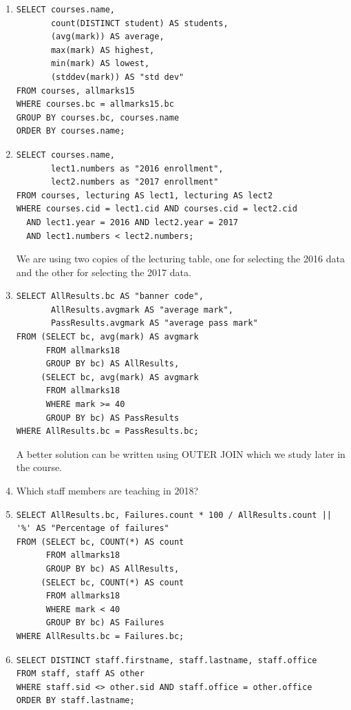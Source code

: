\begin{enumerate}
    \item[a.] 
\begin{lstlisting}
SELECT courses.name,
       count(DISTINCT student) AS students,
       (avg(mark)) AS average,
       max(mark) AS highest,
       min(mark) AS lowest,
       (stddev(mark)) AS "std dev"
FROM courses, allmarks15
WHERE courses.bc = allmarks15.bc
GROUP BY courses.bc, courses.name
ORDER BY courses.name;
\end{lstlisting}

    \item[b.]
\begin{lstlisting}
SELECT courses.name,
       lect1.numbers as "2016 enrollment",
       lect2.numbers as "2017 enrollment"
FROM courses, lecturing AS lect1, lecturing AS lect2
WHERE courses.cid = lect1.cid AND courses.cid = lect2.cid
  AND lect1.year = 2016 AND lect2.year = 2017
  AND lect1.numbers < lect2.numbers;
\end{lstlisting}
We are using two copies of the lecturing table, one for selecting the 2016 data and the other for selecting the 2017 data.

    \item[c.]
\begin{lstlisting}
SELECT AllResults.bc AS "banner code",
       AllResults.avgmark AS "average mark",
       PassResults.avgmark AS "average pass mark"
FROM (SELECT bc, avg(mark) AS avgmark
      FROM allmarks18
      GROUP BY bc) AS AllResults,
     (SELECT bc, avg(mark) AS avgmark
      FROM allmarks18
      WHERE mark >= 40
      GROUP BY bc) AS PassResults
WHERE AllResults.bc = PassResults.bc;
\end{lstlisting}
A better solution can be written using OUTER JOIN which we study later in the course.

    \item[d.] Which staff members are teaching in 2018?

    \item[e.]
\begin{lstlisting}
SELECT AllResults.bc, Failures.count * 100 / AllResults.count || '%' AS "Percentage of failures"
FROM (SELECT bc, COUNT(*) AS count
      FROM allmarks18
      GROUP BY bc) AS AllResults,
     (SELECT bc, COUNT(*) AS count
      FROM allmarks18
      WHERE mark < 40
      GROUP BY bc) AS Failures
WHERE AllResults.bc = Failures.bc;
\end{lstlisting}

    \item[f.]
\begin{lstlisting}
SELECT DISTINCT staff.firstname, staff.lastname, staff.office
FROM staff, staff AS other
WHERE staff.sid <> other.sid AND staff.office = other.office
ORDER BY staff.lastname;
\end{lstlisting}


\end{enumerate}
